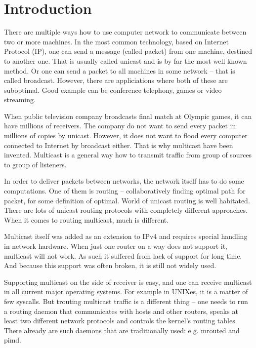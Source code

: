 \chapter*{Introduction}


There are multiple ways how to use computer network to communicate between two
or more machines. In the most common technology, based on Internet Protocol
(IP), one can send a message (called packet) from one machine, destined to
another one. That is usually called unicast and is by far the most well known
method. Or one can send a packet to all machines in some network -- that is
called broadcast. However, there are appliciations where both of these
are suboptimal. Good example can be conference telephony, games or video
streaming.

When public television company broadcasts final match at Olympic games, it can
have millions of receivers. The company do not want to send every packet in
millions of copies by unicast. However, it does not want to flood every
computer connected to Internet by broadcast either. That is why multicast have
been invented. Multicast is a general way how to transmit traffic from group of
sources to group of listeners.

In order to deliver packets between networks, the network itself has to do some
computations. One of them is routing -- collaboratively finding optimal path
for packet, for some definition of optimal.
World of unicast routing is well habitated. There are lots of unicast routing
protocols with completely different approaches. When it comes to routing
multicast, much is different.

Multicast itself was added as an extension to IPv4 and requires special
handling in network hardware. When just one router on a way does not support
it, multicast will not work. As such it suffered from lack of support for long
time. And because this support was often broken, it is still not widely used.

Supporting multicast on the side of receiver is easy, and one can receive
multicast in all current major operating systems. For example in UNIXes, it is
a matter of few syscalls. But trouting multicast traffic is a different thing
-- one needs to run a routing daemon that communicates with hosts and other
routers, speaks at least two different network protocols and controls the
kernel's routing tables. There already are such daemons that are traditionally
used: e.g. mrouted and pimd.

